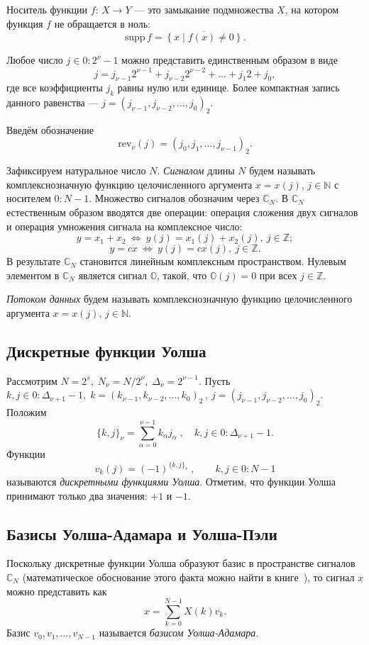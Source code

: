 \documentclass{matmex-diploma-custom}
\begin{document}
Носитель функции $f: \, X \rightarrow Y$ --- 
это замыкание подмножества $X$, на котором функция $f$ не обращается в ноль:
$$
 \mathrm{supp}\,f=\overline{\left\{x\mid f(x)\ne 0\right\}}.
$$

Любое число $j \in 0:2^\nu - 1$ можно представить единственным образом в виде
$$
 j = j_{\nu-1} 2^{\nu-1} + j_{\nu-2} 2^{\nu-2} + \ldots + j_1 2 + j_0,
$$
где все коэффициенты $j_k$ равны нулю или единице. Более компактная запись данного
равенства --- $j=(j_{\nu-1}, j_{\nu-2}, \ldots, j_0)_2$.

Введём обозначение  
$$
  \mathrm{rev}_\nu(j) = (j_0, j_1, \ldots, j_{\nu-1})_2.
$$

Зафиксируем натуральное число $N$. \emph{Сигналом} длины $N$ будем называть комплекснозначную 
функцию целочисленного аргумента $x = x(j), \, j \in \mathbb{N}$ с носителем $0:N-1$. 
Множество сигналов обозначим через 
$\mathbb{C}_N$. В $\mathbb{C}_N$ естественным образом вводятся две операции: 
операция сложения двух сигналов и операция умножения сигнала на комплексное число:
$$
y = x_1+x_2 \: \Leftrightarrow \: y(j) = x_1(j) + x_2(j), \: j \in \mathbb{Z};
$$
$$
y = cx \: \Leftrightarrow \: y(j) = cx(j), \: j \in \mathbb{Z}.
$$
В результате $\mathbb{C}_N$ становится линейным комплексным пространством. Нулевым
элементом в $\mathbb{C}_N$ является сигнал $\mathbb{O}$, такой, что
$\mathbb{O}(j) = 0$ при всех $j \in \mathbb{Z}$.

\emph{Потоком данных} будем называть комплекснозначную 
функцию целочисленного аргумента $x = x(j), \, j \in \mathbb{N}$.




\subsection{Дискретные функции Уолша}
Рассмотрим $N = 2^s, \; N_\nu = N/2^\nu, \; \Delta_\nu = 2^{\nu - 1}$.
Пусть 
$k,j \in 0 : \Delta_{\nu+1}-1, \; k=(k_{\nu-1},k_{\nu-2},\ldots,k_0)_2 \, , \: j=(j_{\nu-1},j_{\nu-2},\ldots,j_0)_2$. 
Положим 
$$
\{k,j\}_\nu = \sum_{\alpha=0}^{\nu-1} k_\alpha j_\alpha \; , \quad k,j \in 0: \Delta_{\nu+1} - 1.
$$
Функции 
$$
v_k(j) = (-1)^{{\{k,j\}}_s} \;, \qquad k,j \in 0:N-1
$$ 
называются \emph{дискретными функциями Уолша}. Отметим, что функции Уолша 
принимают только два значения: $+1$ и $-1$.





\subsection{Базисы Уолша-Адамара и Уолша-Пэли}
Поскольку дискретные функции Уолша образуют базис в пространстве сигналов 
$\mathbb{C}_N$ 
(математическое обоснование этого факта можно найти в книге~\cite{dha}), то 
сигнал $x$ можно представить как
$$
x = \sum_{k=0}^{N-1} X(k) v_k.
$$
Базис $v_0, v_1, \ldots, v_{N-1}$ называется \emph{базисом Уолша-Адамара}.
\end{document}
